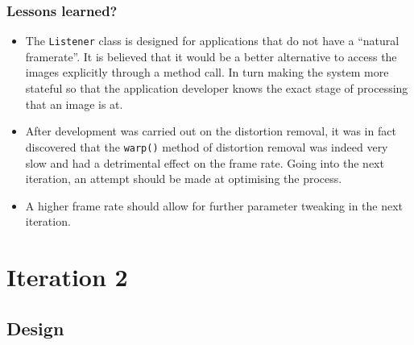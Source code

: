 \documentclass[11pt,oneside]{report}
\newcommand\code[1]{\texttt{#1}}
\begin{document}
		\subsubsection{Lessons learned?}
			\begin{itemize}
				\item The \code{Listener} class is designed for applications that do not have a ``natural framerate''. It is believed that it would be a better alternative to access the images explicitly through a method call. In turn making the system more stateful so that the application developer knows the exact stage of processing that an image is at.
				\item After development was carried out on the distortion removal, it was in fact discovered that the \code{warp()} method of distortion removal was indeed very slow and had a detrimental effect on the frame rate. Going into the next iteration, an attempt should be made at optimising the process.
				\item A higher frame rate should allow for further parameter tweaking in the next iteration.
			\end{itemize}
			
	\section{Iteration 2}\label{sec:p2}
		\subsection{Design}
\end{document}
